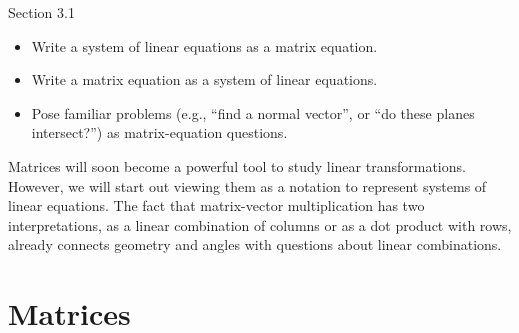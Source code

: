 \documentclass{problemset}
\begin{document}
\begin{lesson}

	Section 3.1

	\begin{itemize}
		\item Write a system of linear equations as a matrix equation.
		\item Write a matrix equation as a system of linear equations.
		\item Pose familiar problems (e.g., ``find a normal vector'', or
			``do these planes intersect\mbox{?}'') as matrix-equation
			questions.
	\end{itemize}

	Matrices will soon become a powerful tool to study linear transformations.
	However, we will start out viewing them as a notation to represent
	systems of linear equations. The fact that matrix-vector multiplication
	has two interpretations, as a linear combination of columns or as a dot product
	with rows, already connects geometry and angles with questions about linear combinations.

\end{lesson}
\section*{Matrices}
\end{document}
